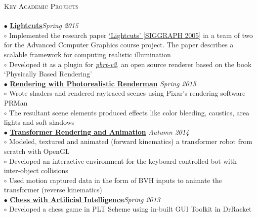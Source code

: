 \documentclass[a4paper,9pt]{article}
\begin{document}
\textcolor{myrust}{\large{\textsc{Key Academic Projects}}}\textcolor{mygray}{\sout{\hfill}}\\\\
\small %
\textbf{$\bullet$} \href{https://github.com/ranveeraggarwal/lightcuts}{\textbf{Lightcuts}}\hfill\textit{Spring 2015}\\
\hspace*{0.35cm}$\circ$ Implemented the research paper \href{http://www.cs.cornell.edu/~kb/projects/lightcuts/}{`Lightcuts' [SIGGRAPH 2005]} in a team of two for the Advanced Computer Graphics course project. The paper describes a scalable framework for computing realistic illumination\\
\hspace*{0.35cm}$\circ$ Developed it as a plugin for \href{http://www.pbrt.org/}{\textsl{pbrt-v2}}, an open source renderer based on the book `Physically Based Rendering'\\
\textbf{$\bullet$} \href{https://github.com/ranveeraggarwal/renderman-transformer/}{\textbf{Rendering with Photorealistic Renderman}} \hfill \textit{Spring 2015}\\
\hspace*{0.35cm}$\circ$ Wrote shaders and rendered raytraced scenes using Pixar's rendering software PRMan\\
\hspace*{0.35cm}$\circ$ The resultant scene elements produced effects like color bleeding, caustics, area lights and soft shadows\\
\textbf{$\bullet$} \href{https://github.com/ranveeraggarwal/transformer}{\textbf{Transformer Rendering and Animation}} \hfill \textit{Autumn 2014}\\
\hspace*{0.35cm}$\circ$ Modeled, textured and animated (forward kinematics) a transformer robot from scratch with OpenGL\\
\hspace*{0.35cm}$\circ$ Developed an interactive environment for the keyboard controlled bot with inter-object collisions\\
\hspace*{0.35cm}$\circ$ Used motion captured data in the form of BVH inputs to animate the transformer (reverse kinematics)\\
\textbf{$\bullet$} \href{https://github.com/ranveeraggarwal/chess-titans}{\textbf{Chess with Artificial Intelligence}}\hfill \textit{Spring 2013}\\
\hspace*{0.35cm}$\circ$ Developed a chess game in PLT Scheme using in-built GUI Toolkit in DrRacket\\
\end{document}
